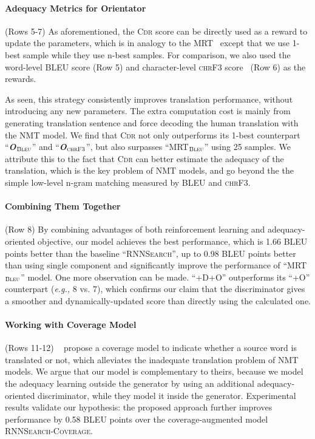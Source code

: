 \documentclass[letterpaper]{article} \usepackage{aaai19}  \usepackage{times}  \usepackage{helvet}  \usepackage{courier}  \usepackage{url}  \usepackage{graphicx}  \frenchspacing  \setlength{\pdfpagewidth}{8.5in}  \setlength{\pdfpageheight}{11in}  \usepackage{amsmath}
\begin{document}
\paragraph{\bf Adequacy Metrics for Orientator} (Rows 5-7)
As aforementioned, the \textsc{Cdr} score can be directly used as a reward to update the parameters, which is in analogy to the MRT~\cite{Shen:2016:ACL} except that we use 1-best sample while they use n-best samples. For comparison, we also used the word-level BLEU score (Row 5) and character-level \textsc{chrF3} score~\cite{popovic2015chrf} (Row 6) as the rewards.

As seen, this strategy consistently improves translation performance, without introducing any new parameters. The extra computation cost is mainly from generating translation sentence and force decoding the human translation with the NMT model.
We find that \textsc{Cdr} not only outperforms its 1-best counterpart ``{\bf \em O}$_{\textsc{Bleu}}$'' and ``{\bf \em O}$_{\textsc{chrF3}}$'', but also surpasses ``MRT$_{\textsc{Bleu}}$'' using 25 samples. 
We attribute this to the fact that \textsc{Cdr} can better estimate the adequacy of the translation, which is the key problem of NMT models, and go beyond the  the simple low-level n-gram matching measured by BLEU and \textsc{chrF3}.


\paragraph{\bf Combining Them Together} (Row 8)
By combining advantages of both reinforcement learning and adequacy-oriented objective, our model achieves the best performance, which is 1.66 BLEU points better than the baseline ``\textsc{RNNSearch}'',  up to 0.98 BLEU points better than using single component and significantly improve the performance of ``MRT$_{\textsc{Bleu}}$'' model.
One more observation can be made. ``+D+O'' outperforms its ``+O'' counterpart (\emph{e.g.,}\xspace 8 vs. 7), which confirms our claim that the discriminator gives a smoother and dynamically-updated score than directly using the calculated one.

\paragraph{\bf Working with Coverage Model} (Rows 11-12)
\citeauthor{tu2016modeling}~ propose a coverage model to indicate whether a source word is translated or not, which alleviates the inadequate translation problem of NMT models. We argue that our model is complementary to theirs, because we model the adequacy learning outside the generator by using an additional adequacy-oriented discriminator, while they model it inside the generator.
Experimental results validate our hypothesis: the proposed approach further improves performance by 0.58 BLEU points over the coverage-augmented model \textsc{RNNSearch-Coverage}.
\end{document}
